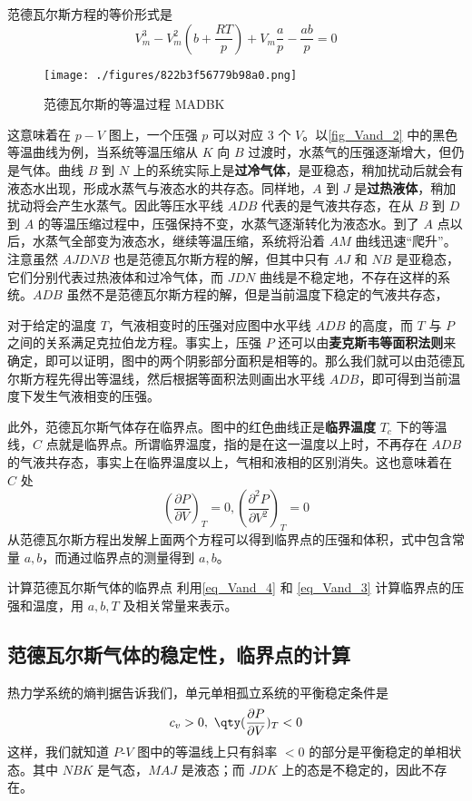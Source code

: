 范德瓦尔斯方程的等价形式是
\begin{equation}\label{eq_Vand_4}
V_m^3-V_m^2(b+\frac{RT}{p})+V_m\frac{a}{p}-\frac{ab}{p}=0
\end{equation}

\begin{figure}[ht]
\centering
\texttt{[image: ./figures/822b3f56779b98a0.png]}
\caption{范德瓦尔斯的等温过程 MADBK} \label{fig_Vand_2}
\end{figure}


这意味着在 $p-V$ 图上，一个压强 $p$ 可以对应 $3$ 个 $V$。以\autoref{fig_Vand_2} 中的黑色等温曲线为例，当系统等温压缩从 $K$ 向 $B$ 过渡时，水蒸气的压强逐渐增大，但仍是气体。曲线 $B$ 到 $N$ 上的系统实际上是\textbf{过冷气体}，是亚稳态，稍加扰动后就会有液态水出现，形成水蒸气与液态水的共存态。同样地，$A$ 到 $J$ 是\textbf{过热液体}，稍加扰动将会产生水蒸气。因此等压水平线 $ADB$ 代表的是气液共存态，在从 $B$ 到 $D$ 到 $A$ 的等温压缩过程中，压强保持不变，水蒸气逐渐转化为液态水。到了 $A$ 点以后，水蒸气全部变为液态水，继续等温压缩，系统将沿着 $AM$ 曲线迅速“爬升”。注意虽然 $AJDNB$ 也是范德瓦尔斯方程的解，但其中只有 $AJ$ 和 $NB$ 是亚稳态，它们分别代表过热液体和过冷气体，而 $JDN$ 曲线是不稳定地，不存在这样的系统。$ADB$ 虽然不是范德瓦尔斯方程的解，但是当前温度下稳定的气液共存态，

对于给定的温度 $T$，气液相变时的压强对应图中水平线 $ADB$ 的高度，而 $T$ 与 $P$ 之间的关系满足克拉伯龙方程。事实上，压强 $P$ 还可以由\textbf{麦克斯韦等面积法则}来确定，即可以证明，图中的两个阴影部分面积是相等的。那么我们就可以由范德瓦尔斯方程先得出等温线，然后根据等面积法则画出水平线 $ADB$，即可得到当前温度下发生气液相变的压强。

此外，范德瓦尔斯气体存在临界点。图中的红色曲线正是\textbf{临界温度} $T_c$ 下的等温线，$C$ 点就是临界点。所谓临界温度，指的是在这一温度以上时，不再存在 $ADB$ 的气液共存态，事实上在临界温度以上，气相和液相的区别消失。这也意味着在 $C$ 处
\begin{equation}\label{eq_Vand_3}
\left(\frac{\partial P}{\partial V}\right)_T=0,
\left(\frac{\partial^2 P}{\partial V^2}\right)_T=0
\end{equation}
从范德瓦尔斯方程出发解上面两个方程可以得到临界点的压强和体积，式中包含常量 $a,b$，而通过临界点的测量得到 $a,b$。
\begin{exercise}{计算范德瓦尔斯气体的临界点}
利用\autoref{eq_Vand_4} 和 \autoref{eq_Vand_3} 计算临界点的压强和温度，用 $a,b,T$ 及相关常量来表示。
\end{exercise}
\subsection{范德瓦尔斯气体的稳定性，临界点的计算}
热力学系统的熵判据告诉我们，单元单相孤立系统的平衡稳定条件是
\begin{equation}\label{eq_Vand_1}
c_v>0,\ \qty(\frac{\partial P}{\partial V})_T<0
\end{equation}
这样，我们就知道 $P$-$V$ 图中的等温线上只有斜率 $<0$ 的部分是平衡稳定的单相状态。其中 $NBK$ 是气态，$MAJ$ 是液态；而 $JDK$ 上的态是不稳定的，因此不存在。


